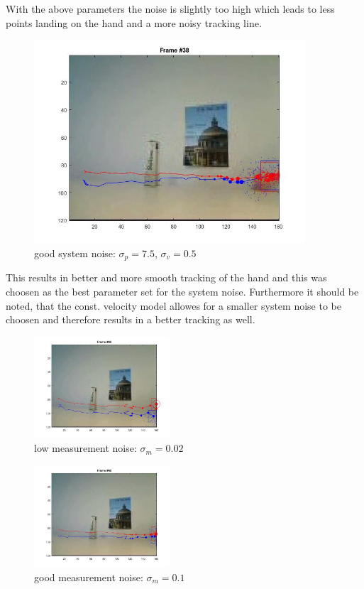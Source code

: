 \documentclass[12pt]{article}
\begin{document}
\vspace{5mm}
With the above parameters the noise is slightly too high which leads to less points landing on the hand and a more noisy tracking line. 
\vspace{5mm}
\begin{figure}[H]
	\centering
	\includegraphics[width=0.9\textwidth]{normal_low_noise.jpg}
	\caption{good system noise: $\sigma_p = 7.5$, $\sigma_v = 0.5$}
	\label{fig1}
\end{figure}
This results in better and more smooth tracking of the hand and this was choosen as the best parameter set for the system noise. Furthermore it should be noted, that the const. velocity model allowes for a smaller system noise to be choosen and therefore results in a better tracking as well.
\begin{figure}[H]
	\centering
	\includegraphics[width=0.45\textwidth]{observe_002.jpg}
	\caption{low measurement noise: $\sigma_m = 0.02$}
	\label{fig1}
\end{figure}
\begin{figure}[H]
	\centering
	\includegraphics[width=0.45\textwidth]{observe_normal.jpg}
	\caption{good measurement noise: $\sigma_m = 0.1$}
	\label{fig1}
\end{figure}
\end{document}
